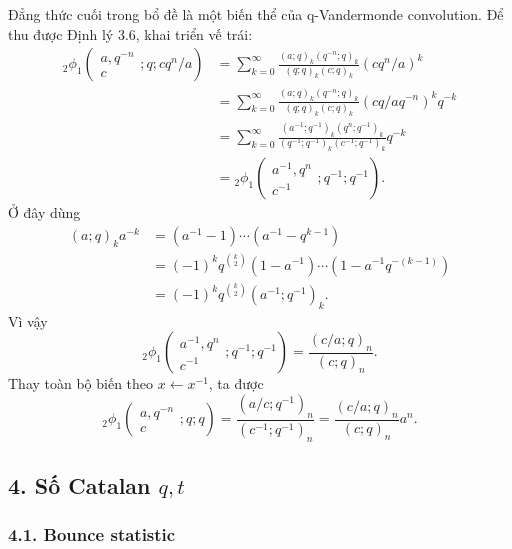 \documentclass[11pt]{article}
\begin{document}
Đẳng thức cuối trong bổ đề là một biến thể của q-Vandermonde convolution. Để
thu được Định lý 3.6, khai triển vế trái:
\[
\begin{aligned}
  {}_2\phi_1
  \left(\begin{matrix}a,q^{-n}\\ c\end{matrix};q;cq^n/a\right)
  &=
  \sum_{k=0}^{\infty}
  \frac{(a;q)_k(q^{-n};q)_k}{(q;q)_k(c;q)_k}(cq^n/a)^k                 \\
  &=
  \sum_{k=0}^{\infty}
  \frac{(a;q)_k(q^{-n};q)_k}{(q;q)_k(c;q)_k}(cq/aq^{-n})^kq^{-k}       \\
  &=
  \sum_{k=0}^{\infty}
  \frac{(a^{-1};q^{-1})_k(q^n;q^{-1})_k}
       {(q^{-1};q^{-1})_k(c^{-1};q^{-1})_k}q^{-k}                    \\
  &=
  {}_2\phi_1
  \left(\begin{matrix}a^{-1},q^n\\ c^{-1}\end{matrix};q^{-1};q^{-1}\right).
\end{aligned}
\]
Ở đây dùng
\[
\begin{aligned}
  (a;q)_k a^{-k}
  &=(a^{-1}-1)\cdots(a^{-1}-q^{k-1})       \\
  &=(-1)^k q^{\binom{k}{2}}
    (1-a^{-1})\cdots(1-a^{-1}q^{-(k-1)})   \\
  &=(-1)^k q^{\binom{k}{2}}(a^{-1};q^{-1})_k.
\end{aligned}
\]
Vì vậy
\[
  {}_2\phi_1
  \left(\begin{matrix}a^{-1},q^n\\ c^{-1}\end{matrix};q^{-1};q^{-1}\right)
  =
  \frac{(c/a;q)_n}{(c;q)_n}.
\]
Thay toàn bộ biến theo \(x\leftarrow x^{-1}\), ta được
\[
  {}_2\phi_1
  \left(\begin{matrix}a,q^{-n}\\ c\end{matrix};q;q\right)
  =
  \frac{(a/c;q^{-1})_n}{(c^{-1};q^{-1})_n}
  =
  \frac{(c/a;q)_n}{(c;q)_n}a^n.
\]

\subsection*{4. Số Catalan \(q,t\)}

\subsubsection*{4.1. Bounce statistic}
\end{document}

